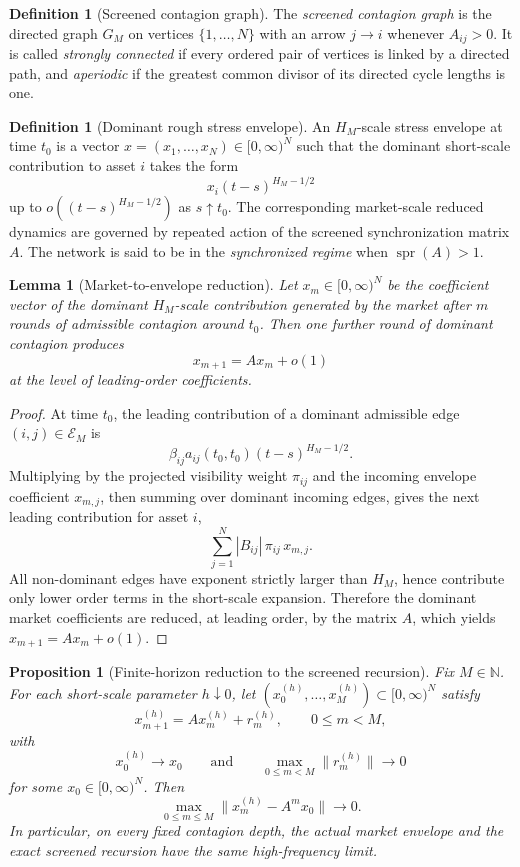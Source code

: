 \documentclass[11pt,a4paper]{amsart}
\theoremstyle{plain}
\newtheorem{proposition}[theorem]{Proposition}
\newtheorem{lemma}[theorem]{Lemma}
\theoremstyle{definition}
\newtheorem{definition}[theorem]{Definition}
\theoremstyle{remark}
\DeclareMathOperator{\spr}{spr}
\newcommand{\N}{\mathbb{N}}
\newcommand{\cE}{\mathcal{E}}
\begin{document}
\begin{definition}[Screened contagion graph]
The \emph{screened contagion graph} is the directed graph \(G_M\) on vertices
\(\{1,\dots,N\}\) with an arrow \(j\to i\) whenever \(A_{ij}>0\).  It is called
\emph{strongly connected} if every ordered pair of vertices is linked by a directed path, and
\emph{aperiodic} if the greatest common divisor of its directed cycle lengths is one.
\end{definition}

\begin{definition}[Dominant rough stress envelope]
An \(H_M\)-scale stress envelope at time \(t_0\) is a vector \(x=(x_1,\dots,x_N)\in[0,\infty)^N\)
such that the dominant short-scale contribution to asset \(i\) takes the form
\[
        x_i (t-s)^{H_M-1/2}
\]
up to \(o((t-s)^{H_M-1/2})\) as \(s\uparrow t_0\).  The corresponding market-scale reduced
dynamics are governed by repeated action of the screened synchronization matrix \(A\).  The network
is said to be in the \emph{synchronized regime} when \(\spr(A)>1\).
\end{definition}

\begin{lemma}[Market-to-envelope reduction]\label{lem:dominant-envelope}
Let \(x_m\in[0,\infty)^N\) be the coefficient vector of the dominant \(H_M\)-scale contribution
generated by the market after \(m\) rounds of admissible contagion around \(t_0\).  Then one
further round of dominant contagion produces
\[
        x_{m+1}=A x_m + o(1)
\]
at the level of leading-order coefficients.
\end{lemma}

\begin{proof}
At time \(t_0\), the leading contribution of a dominant admissible edge \((i,j)\in\cE_M\) is
\[
        \beta_{ij}a_{ij}(t_0,t_0)(t-s)^{H_M-1/2}.
\]
Multiplying by the projected visibility weight \(\pi_{ij}\) and the incoming envelope coefficient
\(x_{m,j}\), then summing over dominant incoming edges, gives the next leading contribution for
asset \(i\),
\[
        \sum_{j=1}^N
        |B_{ij}|\,\pi_{ij}\,x_{m,j}.
\]
All non-dominant edges have exponent strictly larger than \(H_M\), hence contribute only lower
order terms in the short-scale expansion.  Therefore the dominant market coefficients are reduced,
at leading order, by the matrix \(A\), which yields \(x_{m+1}=Ax_m+o(1)\).
\end{proof}

\begin{proposition}[Finite-horizon reduction to the screened recursion]\label{prop:finite-horizon-reduction}
Fix \(M\in\N\).  For each short-scale parameter \(h\downarrow0\), let
\((x_0^{(h)},\dots,x_M^{(h)})\subset[0,\infty)^N\) satisfy
\[
        x_{m+1}^{(h)}=A x_m^{(h)}+r_m^{(h)},
        \qquad
        0\le m<M,
\]
with
\[
        x_0^{(h)}\to x_0
        \qquad\text{and}\qquad
        \max_{0\le m<M}\|r_m^{(h)}\|\to0
\]
for some \(x_0\in[0,\infty)^N\).  Then
\[
        \max_{0\le m\le M}\|x_m^{(h)}-A^m x_0\|\to0.
\]
In particular, on every fixed contagion depth, the actual market envelope and the exact screened
recursion have the same high-frequency limit.
\end{proposition}
\end{document}
